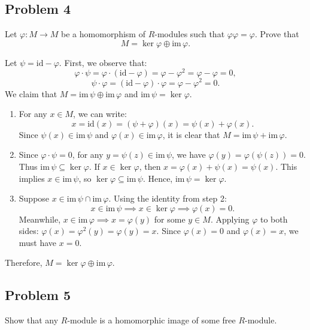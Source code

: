 \subsection*{Problem 4}
Let $\varphi : M \to M$ be a homomorphism of $R$-modules such that $\varphi\varphi = \varphi$. Prove that
\[ M = \ker \varphi \oplus \text{im}\,\varphi. \]

\begin{solution}
Let $\psi = \text{id} - \varphi$. First, we observe that:
\[ \varphi \cdot \psi = \varphi \cdot (\text{id} - \varphi) = \varphi - \varphi^2 = \varphi - \varphi = 0, \]
\[ \psi \cdot \varphi = (\text{id} - \varphi) \cdot \varphi = \varphi - \varphi^2 = 0. \]
We claim that $M = \text{im} \, \psi \oplus \text{im} \, \varphi$ and $\text{im} \, \psi = \ker \varphi$.

\begin{enumerate}
    \item 
    For any $x \in M$, we can write:
    \[ x = \text{id}(x) = (\psi + \varphi)(x) = \psi(x) + \varphi(x). \]
    Since $\psi(x) \in \text{im} \, \psi$ and $\varphi(x) \in \text{im} \, \varphi$, it is clear that $M = \text{im} \, \psi + \text{im} \, \varphi$.

    \item 
     Since $\varphi \cdot \psi = 0$, for any $y = \psi(z) \in \text{im} \, \psi$, we have $\varphi(y) = \varphi(\psi(z)) = 0$. Thus $\text{im} \, \psi \subseteq \ker \varphi$.
     If $x \in \ker \varphi$, then $x =\varphi(x)+ \psi(x)= \psi(x)$. 
        This implies $x \in \text{im} \, \psi$, so $\ker \varphi \subseteq \text{im} \, \psi$.
    Hence, $\text{im} \, \psi = \ker \varphi$.

    \item 
    Suppose $x \in \text{im} \, \psi \cap \text{im} \, \varphi$. Using the identity from step 2:
    \[ x \in \text{im} \, \psi \implies x \in \ker \varphi \implies \varphi(x) = 0. \]
    Meanwhile, $x \in \text{im} \, \varphi \implies x = \varphi(y)$ for some $y \in M$. 
    Applying $\varphi$ to both sides: $\varphi(x) = \varphi^2(y) = \varphi(y) = x$.
    Since $\varphi(x) = 0$ and $\varphi(x) = x$, we must have $x = 0$.
\end{enumerate}
Therefore, $M = \ker \varphi \oplus \text{im} \, \varphi$.
\end{solution}

\subsection*{Problem 5}
Show that any $R$-module is a homomorphic image of some free $R$-module.

